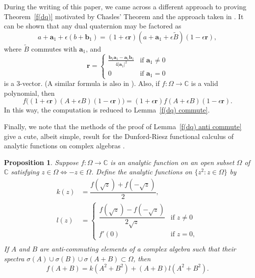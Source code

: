\documentclass[12pt,reqno]{amsart}
\newtheorem{prop}[theorem]{Proposition}
\begin{document}
During the writing of this paper, we came across a different approach to proving Theorem~\ref{f(dq)} motivated by Chasles' Theorem and the approach taken in \cite{wang-et-al}.  It can be shown that any dual quaternion may be factored as
\begin{equation}
a + \bm a_1 + \epsilon (b + \bm b_1) = (1 + \epsilon \bm r) (a + \bm a_1 + \epsilon \tilde B) (1 - \epsilon \bm r),
\end{equation}
where $\tilde B$ commutes with $\bm a_1$, and
\begin{equation}
\bm r = \begin{cases} \frac{\bm b_1 \bm a_1 - \bm a_1 \bm b_1 }{4|\bm a_1|^2} & \text{if $\bm a_1 \ne 0$} \\ 0 & \text{if $\bm a_1 = 0$} \end{cases}
\end{equation}
is a 3-vector.  (A similar formula is also in \cite{selig}).  Also, if $f:\Omega \to \mathbb C$ is a valid polynomial, then
\begin{equation}
f\bigl((1 + \epsilon \bm r) (A + \epsilon B) (1 - \epsilon \bm r)\bigr) = (1 + \epsilon \bm r) f(A + \epsilon B) (1 - \epsilon \bm r) .
\end{equation}
In this way, the computation is reduced to Lemma~\ref{f(dq) commute}.

\bigskip

Finally, we note that the methods of the proof of Lemma~\ref{f(dq) anti commute} give a cute, albeit simple, result for the Dunford-Riesz functional calculus of analytic functions on complex algebras \cite{dunford-et-al}.

\begin{prop}
\label{analytic}
Suppose $f:\Omega \to \mathbb C$ is an analytic function on an open subset $\Omega$ of $\mathbb C$ satisfying $z \in \Omega \Leftrightarrow -z \in \Omega$.  Define the analytic functions on $\{z^2 : z \in \Omega\}$ by
\begin{align}
\label{g a}
k(z) &= \dfrac{f(\sqrt z) + f(-\sqrt z)}{2} ,\\
\label{h a}
l(z) &= \begin{cases}
\dfrac{f(\sqrt z) - f(-\sqrt z)}{2\sqrt z} &\text{if $z \ne 0$} \\
f'(0) &\text{if $z = 0$} ,
\end{cases} \\
\end{align}
If $A$ and $B$ are anti-commuting elements of a complex algebra such that their spectra $\sigma(A) \cup \sigma(B) \cup \sigma(A+B) \subset \Omega$, then
\begin{equation}
f(A+B) = k(A^2+B^2) + (A+B) l(A^2+B^2) .
\end{equation}
\end{prop}
\end{document}
